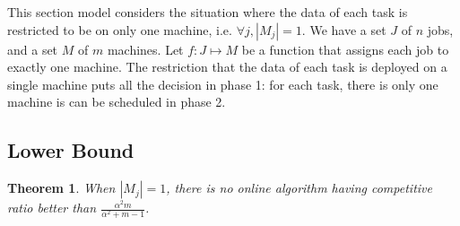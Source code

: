 \documentclass[10pt, conference, compsocconf]{IEEEtran}
\newtheorem{theorem}{Theorem}
\begin{document}
This section model considers the situation where the data of each task
is restricted to be on only one machine, i.e. $\forall j, |M_j|=1$.
We have a set $J$ of $ n$ jobs, and a set $M$ of $m$ machines.  Let $f
: J \mapsto M$ be a function that assigns each job to exactly one
machine. The restriction that the data of each task is deployed on a
single machine puts all the decision in phase 1: for each task,
there is only one machine is can be scheduled in phase 2.

\subsection{Lower Bound}


\begin{theorem}
\label{th:model1-lb}
  When $|M_j| = 1$, there is no online algorithm having competitive
  ratio better than $\frac{\alpha^{2}m }{\alpha^{2} + m-1}$.
\end{theorem}
 
\end{document}
